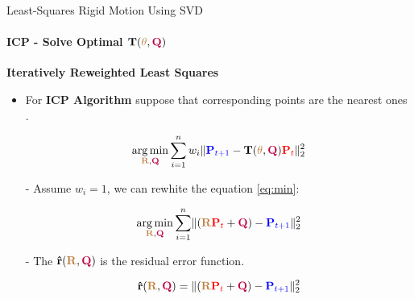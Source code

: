 \documentclass[aspectratio=169]{beamer}
\DeclareMathOperator*{\argmin}{arg\,min}
\newcommand{\tikzRot}{0}
\newcommand{\tikzTrans}{(0,0)}
\newcommand{\tikzShowrobot}{0}
\newcommand{\tikzOneCenter}{0}
\begin{document}
\begin{frame}[fragile, c]{Least-Squares Rigid Motion Using SVD}
	\framesubtitle{ICP - Solve Optimal $\mathbf{T}(\textcolor{brown}{\theta}, \textcolor{purple}{\mathbf{Q}})$}
	\textbf{Iteratively Reweighted Least Squares}

	\begin{minipage}[t]{0.5\textwidth}
		\begin{figure}
			\resizebox{0.7\textwidth}{!}{
				\renewcommand{\tikzRot}{30}
				\renewcommand{\tikzTrans}{(8,0)}
				\renewcommand{\tikzShowrobot}{0}
				\renewcommand{\tikzOneCenter}{0}
				\resizebox{0.8\textwidth}{!}{
				}
			}
		\end{figure}
	\end{minipage}
	\begin{minipage}[t]{0.5\textwidth}

	\vspace{-0.2in}
	\begin{itemize}
		\item For \textbf{ICP Algorithm} suppose that corresponding points are the nearest ones \cite{prochazkova2018notes}.

	\vspace{-0.2in}
	\begin{equation}
		\argmin\limits_{\textcolor{brown}{\mathbf{R}}, \textcolor{purple}{\mathbf{Q}}} \sum\limits_{i=1}^n w_i \lVert \textcolor{blue}{\mathbf{P}_{t+1}}
		- \mathbf{T}(\textcolor{brown}{\theta}, \textcolor{purple}{\mathbf{Q}})
		\textcolor{red}{\mathbf{P}_{t}} \rVert^2_2
		\label{eq:min}
	\end{equation}

	\item[-] Assume $w_i = 1$, we can rewhite the equation \ref{eq:min}:

	\vspace{-0.2in}
	\begin{equation*}
		\argmin\limits_{\textcolor{brown}{\mathbf{R}}, \textcolor{purple}{\mathbf{Q}}} \sum\limits_{i=1}^n  
		\lVert (\textcolor{brown}{\mathbf{R}}\textcolor{red}{\mathbf{P}_{t}}  + \textcolor{purple}{\mathbf{Q}})
		-  \textcolor{blue}{\mathbf{P}_{t+1}}\rVert^2_2
	\end{equation*}

	\item[-] The $\mathbf{\hat{r}}(\textcolor{brown}{\mathbf{R}}, \textcolor{purple}{\mathbf{Q}})$ is the residual error function.
	
	\vspace{-0.2in}
	\begin{equation*}
		\mathbf{\hat{r}}(\textcolor{brown}{\mathbf{R}}, \textcolor{purple}{\mathbf{Q}}) = 
		\lVert (\textcolor{brown}{\mathbf{R}}\textcolor{red}{\mathbf{P}_{t}}  + \textcolor{purple}{\mathbf{Q}})
		-  \textcolor{blue}{\mathbf{P}_{t+1}} \rVert ^2_2
	\end{equation*}

	\end{itemize}
	\end{minipage}
\end{frame}
\end{document}
